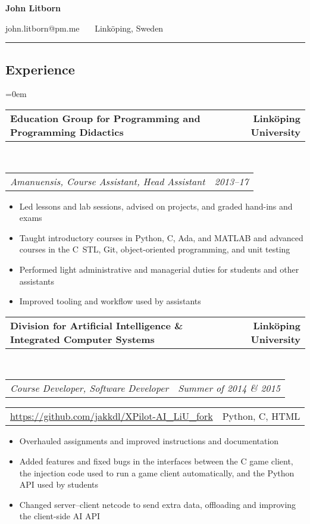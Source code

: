 \documentclass[10pt,letterpaper]{article}
\makeatletter
\newcommand{\headerrow}[2]
{\begin{tabular*}{\linewidth}{l@{\extracolsep{\fill}}r}
    #1 &
    #2 \\
\end{tabular*}}
\newcommand{\CPP}
{C\nolinebreak[4]\hspace{-.05em}\raisebox{.22ex}{\footnotesize\bf ++}}
\makeatother
\begin{document}
\begin{center}
    {\LARGE \textbf{John Litborn}}

    john.litborn@pm.me
    \ \textbullet \ \
    Linköping, Sweden
\end{center}

\hrule
\vspace{-0.4em}
\subsection*{Experience}

\parindent=0em
\headerrow
{\textbf{Education Group for Programming and Programming
Didactics}}
{\textbf{Linköping University}}
\\
\headerrow
{\emph{Amanuensis, Course Assistant, Head Assistant}}
{\emph{2013--17}}
\begin{itemize}[noitemsep, topsep=1pt]
    \item Led lessons and lab sessions, advised on projects, and graded
        hand-ins and exams
    \item Taught introductory courses in Python, \CPP, Ada, and MATLAB and
        advanced courses in the \CPP \ STL, Git, object-oriented programming,
        and unit testing
    \item Performed light administrative and managerial duties for students
        and other assistants
    \item Improved tooling and workflow used by assistants
\end{itemize}
\vspace{0.5em}
\headerrow
{\textbf{Division for Artificial Intelligence \& Integrated Computer Systems}}
{\textbf{Linköping University}}
\\
\headerrow
{\emph{Course Developer, Software Developer}}
{\emph{Summer of 2014 \& 2015}}
\headerrow
{\url{https://github.com/jakkdl/XPilot-AI\_LiU\_fork}}
{Python, C, HTML}
\begin{itemize}[noitemsep, topsep=1pt]
    \item Overhauled assignments and improved instructions and
        documentation
    \item Added features and fixed bugs in the interfaces
        between the C game client, the injection code used to run a game
        client automatically, and the Python API used by students
    \item Changed server--client netcode to send extra data, offloading and
        improving the client-side AI API
\end{itemize}
\vspace{0.5em}
\end{document}
